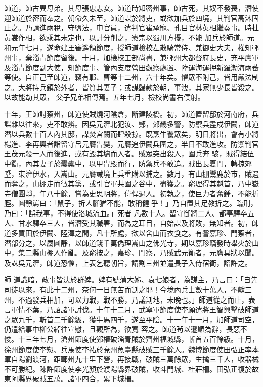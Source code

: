 \begin{pinyinscope}
 師道，師古異母弟。其母張忠志女。師道時知密州事，師古死，其奴不發喪，潛使迎師道於密而奉之。朝命久未至，師道謀於將吏，或欲加兵於四境，其判官高沐固止之。乃請進兩稅，守鹽法，申官員，遣判官崔承寵、孔目官林英相繼奏事。時杜黃裳作相，欲乘其未定也，以計分削之，憲宗以蜀川方擾，不能
 加兵於師道。元和元年七月，遂命建王審遙領節度，授師道檢校左散騎常侍、兼御史大夫，權知鄆州事，棄淄青節度留後。十月，加檢校工部尚書，兼鄆州大都督府長史，充平盧軍及淄青節度副大使，知節度事、管內支度營田觀察處置、陸運海運押新羅渤海兩蕃等使。自正己至師道，竊有鄆、曹等十二州，六十年矣。懼眾不附己，皆用嚴法制之。大將持兵鎮於外者，皆質其妻子；或謀歸款於朝，事洩，其家無少長皆殺之。以故能劫其眾，
 父子兄弟相傳焉。五年七月，檢校尚書右僕射。



 十年，王師討蔡州，師道使賊燒河陰倉，斷建陵橋。初，師道置留邸於河南府，兵諜雜以往來，吏不敢辨。因吳元濟北犯汝、鄭，郊畿多警，防禦兵盡戍伊闕，師道潛以兵數十百人內其邸，謀焚宮闕而肆殺掠。既烹牛饗眾矣，明日將出，會有小將楊進、李再興者詣留守呂元膺告變，元膺追伊闕兵圍之，半日不敢進攻。防禦判官王茂元殺一人而後進，或有毀其墉而入者。賊眾突出殺人，圍兵奔
 駭，賊得結伍中衢，內其妻子於囊橐中，以甲胄殿而行，防禦兵不敢追。賊出長夏門，轉掠郊墅，東濟伊水，入嵩山。元膺誡境上兵重購以捕之。數月，有山棚鬻鹿於市，賊遇而奪之，山棚走而徵其黨，或引官軍共圍之谷中，盡獲之。窮理得其魁首，乃中嶽寺僧圓靜，年八十餘，嘗為史思明將，偉悍過人。初執之，使巨力者奮錘，不能折脛。圓靜罵曰：「鼠子，折人腳猶不能，敢稱健乎！」乃自置其足教折之。臨刑，乃曰：「誤我事，不得使洛城流血。」死者
 凡數十人。留守御將二人、都亭驛卒五人、甘水驛卒三人，皆潛受其職署，而為之耳目，自始謀及將敗，無知者。初，師道多買田於伊闕、陸渾之間，凡十所處，欲以舍山而衣食之。有訾嘉珍、門察者，潛部分之，以屬圓靜，以師道錢千萬偽理嵩山之佛光寺，期以嘉珍竊發時舉火於山中，集二縣山棚人作亂。及窮按之，嘉珍、門察，乃賊武元衡者，元膺具狀以聞。及誅吳元濟，師道恐懼，上表乞聽朝旨，請割三州並遣長子入侍宿衛，詔許之。



 師
 道識暗，政事皆決於群婢。婢有號蒲大姊、袁七娘者，為謀主，乃言曰：「自先司徒以來，有此十二州，奈何一日無苦而割之耶！今境內兵士數十萬人，不獻三州，不過發兵相加，可以力戰，戰不勝，乃議割地，未晚也。」師道從之而止，表言軍情不葉，乃詔諸軍討伐。十年十二月，武寧軍節度使李願遣將王智興擊破師道之眾九千，斬首二千餘級，獲牛馬四千，遂至平陰。十一年十一月，加師道司空，仍遣給事中柳公綽往宣慰，且觀所為，欲寬
 容之。師道茍以遜順為辭，長惡不悛。十三年七月，滄州節度使鄭權破淄青賊於齊州福城縣，斬首五百餘級。十月，徐州節度使李愬、兵馬使李祐於兗州魚臺縣破賊三千餘人。魏博節度使田弘正率本軍自陽劉渡河，距鄆州九十里下營，再接戰，破賊三萬餘眾，生擒三千人，收器械不可勝紀。陳許節度使李光顏於濮陽縣界破賊，收斗門城、杜莊柵。田弘正復於故東阿縣界破賊五萬。諸軍四合，累下城柵。




\end{pinyinscope}
